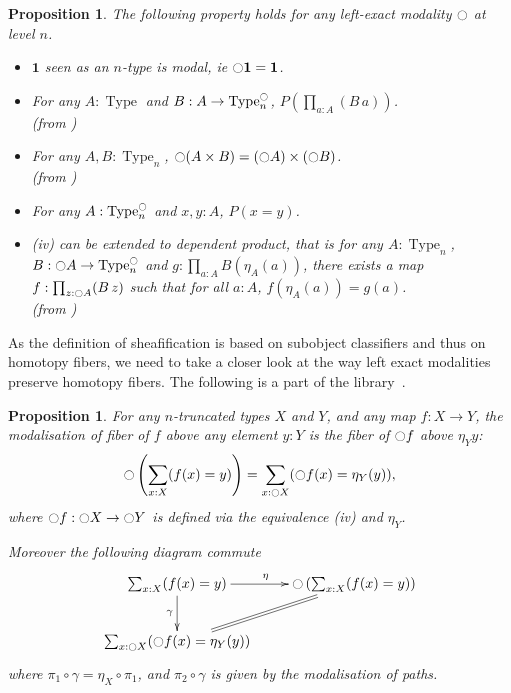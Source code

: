 \documentclass[preprint,9pt,numbers]{sigplanconf}
\newtheorem{prop}[thm]{Proposition}
\newcommand{\mynote}[2]{
    \fbox{\bfseries\sffamily\scriptsize#1}
    {\small$\blacktriangleright$\textsf{\emph{#2}}$\blacktriangleleft$}~}
\newcommand\nt[1]{\mynote{NT}{#1}}
\DeclareMathOperator{\Type}{Type}
\newcommand{\modal}{\ensuremath{\ocircle}}
\newcommand \one {\mathbf{1}}
\newenvironment{mymath}[1][-0em]{%
  \newcommand\mymathaux{\vspace{#1}}%
  \vspace{#1}%
  \begin{equation*}%
  }{ %
    \mymathaux%
  \end{equation*}}
\begin{document}
\begin{prop}

The following property holds for any left-exact modality $\modal$ at
level $n$.
 
\begin{itemize}

\item $\one$ seen as an $n$-type is modal, ie $\modal \one =\one$.
\item 
  For any  $A:\Type$ and $B:A \to \Type_n^\modal$,  $P\left(\prod_{a:A} (B\,
  a)\right)$. \\
(from \cite[Lemma 7.7.2]{hottbook})
\item For any $A,B:\Type_n$,
  $\modal (A\times B) = (\modal A) \times (\modal B)$. \\
(from \cite[Corollary 7.7.2]{hottbook})
\item For any $A:\Type_n^\modal$ and $x,y:A$, $P(x=y)$.
\item 
  {\it (iv)} can be extended to dependent product, that is for any $A:\Type_n$, $B:\modal A \to
  \Type_n^\modal$ and
  $g:\prod_{a:A} B(\eta_A(a))$, there exists a map $f:\prod_{z:\modal
    A} (B\, z)$ such that for all $a:A$, $f(\eta_A(a)) = g(a)$. \\
 (from \cite[Theorem
 7.7.4]{hottbook})
\end{itemize}
\end{prop}

As the definition of sheafification is based on subobject classifiers
and thus on homotopy fibers, we need to take a closer look at the way left
exact modalities preserve homotopy fibers. The following is a part of
the library~\cite{hottlib}.
%
\begin{prop}
\label{sec:defin-basic-prop}
For any $n$-truncated types $X$ and $Y$,
and any map $f:X \to Y$, the modalisation of fiber of $f$ above any element $y:Y$
is the fiber of $\modal f$ above $\eta_Y y$:
\begin{mymath}[-0.3em]\modal \left(\sum_{x:X}  (f(x) = y)\right) = \sum_{x:\modal X}
(\modal f(x) = \eta_Y(y)),\end{mymath}%
where $\modal f:\modal X \to \modal Y$ is defined via the equivalence {\it (iv)} and $\eta_Y$.

Moreover the following diagram commute
\begin{mymath}[-0.3em]\xymatrix{
  \sum_{x:X} (f(x) = y) \ar[r]^\eta \ar[d]_\gamma & \modal \left(\sum_{x:X}  (f(x) = y)\right) \ar@{=}[dl]\\
  \sum_{x:\modal X} (\modal f(x) = \eta_Y(y)) & }\end{mymath}%
where $\pi_1 \circ \gamma = \eta_X \circ \pi_1$, and
$\pi_2 \circ \gamma$ is given by the modalisation of
paths.
\end{prop}
\end{document}
